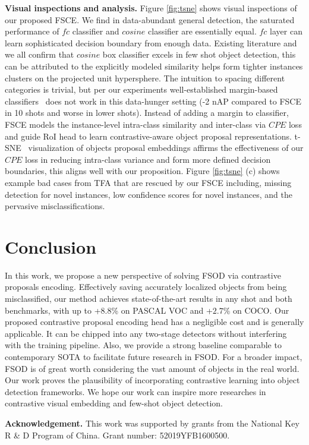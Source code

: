 \documentclass[final]{cvpr}
\begin{document}
\textbf{Visual inspections and analysis.} Figure \ref{fig:tsne} shows visual inspections of our proposed FSCE. We find in data-abundant general detection, the saturated performance of $fc$ classifier and $cosine$ classifier are essentially equal. $fc$ layer can learn sophisticated decision boundary from enough data. Existing literature and we all confirm that $cosine$ box classifier excels in few shot object detection, this can be attributed to the explicitly modeled similarity helps form tighter instances clusters on the projected unit hypersphere. The intuition to spacing different categories is trivial, but per our experiments well-established margin-based classifiers~\cite{cos_face,deng_arcface_2019} does not work in this data-hunger setting (-2 nAP compared to FSCE in 10 shots and worse in lower shots). Instead of adding a margin to classifier, FSCE models the instance-level intra-class similarity and inter-class via $CPE$ loss and guide RoI head to learn contrastive-aware object proposal representations. t-SNE~\cite{t_sne} visualization of objects proposal embeddings affirms the effectiveness of our $CPE$ loss in reducing intra-class variance and form more defined decision boundaries, this aligns well with our proposition. Figure \ref{fig:tsne} (c) shows example bad cases from TFA that are rescued by our FSCE including, missing detection for novel instances, low confidence scores for novel instances, and the pervasive misclassifications.

\vspace{-2mm}
\section{Conclusion}
\vspace{-2mm}
In this work, we propose a new perspective of solving FSOD via contrastive proposals encoding. Effectively saving accurately localized objects from being misclassified, our method achieves state-of-the-art results in any shot and both benchmarks, with up to +$8.8$\% on PASCAL VOC and +$2.7$\% on COCO. Our proposed contrastive proposal encoding head has a negligible cost and is generally applicable. It can be chipped into any two-stage detectors without interfering with the training pipeline. Also, we provide a strong baseline comparable to contemporary SOTA to facilitate future research in FSOD. 
For a broader impact, FSOD is of great worth considering the vast amount of objects in the real world. Our work proves the plausibility of incorporating contrastive learning into object detection frameworks. We hope our work can inspire more researches in contrastive visual embedding and few-shot object detection.

\textbf{Acknowledgement.} This work was supported by grants from the National Key R \& D Program of China. Grant number: 52019YFB1600500. 



{\small



}
\end{document}
